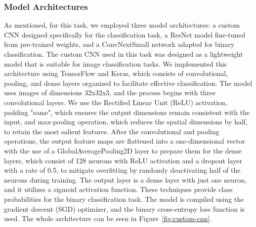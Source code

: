 \documentclass[runningheads]{llncs}
\begin{document}
\subsubsection{Model Architectures}
\vspace*{-30ex} %
As mentioned, for this task, we employed three model architectures:  a custom CNN designed specifically for the classification task, a ResNet model fine-tuned from pre-trained weights, and a ConvNextSmall network adapted for binary classification. 
The custom CNN used in this task was designed as a lightweight model that is suitable for image classification tasks. We implemented this architecture using TensorFlow and Keras, which consists of convolutional, pooling, and dense layers organized to facilitate effective classification. The model uses images of dimensions 32x32x3, and the process begins with three convolutional layers. We use the Rectified Linear Unit (ReLU) activation, padding "same", which ensures the output dimensions remain consistent with the input, and max-pooling operation, which reduces the spatial dimensions by half, to retain the most salient features. After the convolutional and pooling operations, the output feature maps are flattened into a one-dimensional vector with the use of a GlobalAveragePooling2D layer to prepare them for the dense layers, which consist of 128 neurons with ReLU activation and a dropout layer with a rate of 0.5, to mitigate overfitting by randomly deactivating half of the neurons during training. The output layer is a dense layer with just one neuron, and it utilizes a sigmoid activation function. These techniques provide class probabilities for the binary classification task. The model is compiled using the gradient descent (SGD) optimizer, and the binary cross-entropy loss function is used. The whole architecture can be seen in Figure~\ref{fig:custom-cnn}.
\end{document}
